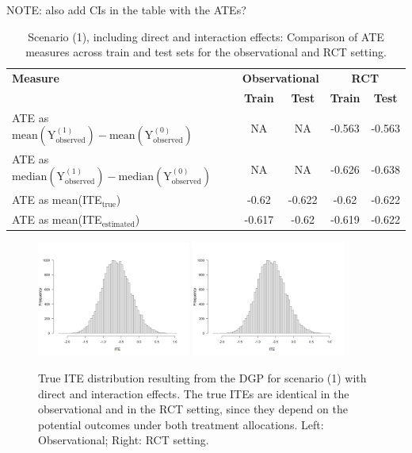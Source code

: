 NOTE: also add CIs in the table with the ATEs?

\begin{table}[htbp]
\centering
\small
\caption{Scenario (1), including direct and interaction effects: Comparison of ATE measures across train and test sets for the observational and RCT setting.}
\label{tab:scenario1_ate_comparison}
\begin{tabular}{l c c c c}
\toprule
\textbf{Measure} & \multicolumn{2}{c}{\textbf{Observational}} & \multicolumn{2}{c}{\textbf{RCT}} \\
\cmidrule(lr){2-3} \cmidrule(lr){4-5}
 & \textbf{Train} & \textbf{Test} & \textbf{Train} & \textbf{Test} \\
\midrule
ATE as $\text{mean}(\text{Y}_\text{observed}^{(1)}) - \text{mean}(\text{Y}_\text{observed}^{(0)})$ & NA & NA & -0.563 & -0.563 \\
ATE as $\text{median}(\text{Y}_\text{observed}^{(1)}) - \text{median}(\text{Y}_\text{observed}^{(0)})$  & NA & NA & -0.626 & -0.638 \\
ATE as mean(ITE$_\text{true}$)  & -0.62 & -0.622 & -0.62 & -0.622 \\
ATE as mean(ITE$_\text{estimated}$) & -0.617 & -0.62 & -0.619 & -0.622 \\
\bottomrule
\end{tabular}
\end{table}




\begin{figure}[htbp]
\centering
\includegraphics[width=0.45\textwidth]{img/results/observ_scenario1_ite_distribution_dgp.png}
\includegraphics[width=0.45\textwidth]{img/results/rct_scenario1_ite_distribution_dgp.png}
\caption{True ITE distribution resulting from the DGP for scenario (1) with direct and interaction effects. The true ITEs are identical in the observational and in the RCT setting, since they depend on the potential outcomes under both treatment allocations. Left: Observational; Right: RCT setting.}
\label{fig:scenario1_ite_distribution_dgp}
\end{figure}



